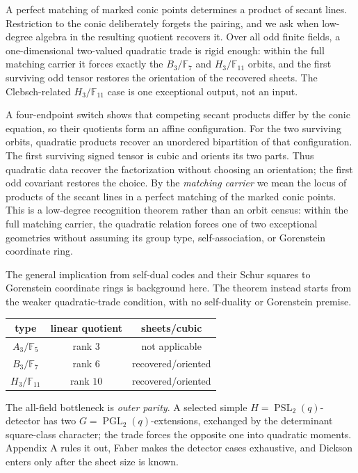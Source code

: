 \documentclass[11pt]{article}
\theoremstyle{definition}
\theoremstyle{remark}
\newcommand{\F}{\mathbb{F}}
\begin{document}
A perfect matching of marked conic points determines a product of secant
lines.  Restriction to the conic deliberately forgets the pairing, and we ask
when low-degree algebra in the resulting quotient recovers it.  Over all odd
finite fields, a one-dimensional two-valued quadratic trade is rigid enough:
within the full matching carrier it forces exactly the $B_3/\F_7$ and
$H_3/\F_{11}$ orbits, and the first surviving odd tensor restores the
orientation of the recovered sheets.  The Clebsch-related $H_3/\F_{11}$ case
is one exceptional output, not an input.

A four-endpoint switch shows that competing secant products differ by the
conic equation, so their quotients form an affine configuration.
For the two surviving orbits, quadratic products recover an unordered
bipartition of that configuration.  The first surviving signed tensor is
cubic and orients its two parts.  Thus quadratic data recover the
factorization without choosing an orientation; the first odd covariant
restores the choice.  By the \emph{matching carrier} we mean the locus of
products of the secant lines in a perfect matching of the marked conic
points.  This is a low-degree recognition theorem rather than an orbit census:
within the full matching carrier, the quadratic relation forces one of two
exceptional geometries without assuming its group type, self-association, or
Gorenstein coordinate ring.

The general implication from self-dual codes and their Schur squares to
Gorenstein coordinate rings is background here.  The theorem instead starts
from the weaker quadratic-trade condition, with no self-duality or Gorenstein
premise.

\begin{center}
\small
\begin{tabular}{@{}c@{\qquad}c@{\qquad}c@{}}
\toprule
type & linear quotient & sheets/cubic\\
\midrule
\(A_3/\F_5\) & rank \(3\) & not applicable\\
\(B_3/\F_7\) & rank \(6\) & recovered/oriented\\
\(H_3/\F_{11}\) & rank \(10\) & recovered/oriented\\
\bottomrule
\end{tabular}
\end{center}
\noindent
The all-field bottleneck is \emph{outer parity}.  A selected simple
\(H=\operatorname{PSL}_2(q)\)-detector has two
\(G=\operatorname{PGL}_2(q)\)-extensions, exchanged by the determinant
square-class character; the trade forces the opposite one into quadratic
moments.  Appendix A rules it out, Faber makes the detector cases exhaustive,
and Dickson enters only after the sheet size is known.
\end{document}
